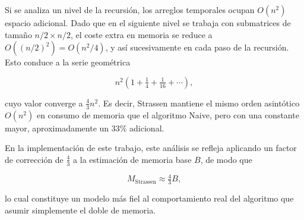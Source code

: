Si se analiza un nivel de la recursión, los arreglos temporales ocupan $O(n^2)$ espacio adicional. 
Dado que en el siguiente nivel se trabaja con submatrices de tamaño $n/2 \times n/2$, el coste extra 
en memoria se reduce a $O((n/2)^2) = O(n^2/4)$, y así sucesivamente en cada paso de la recursión. 
Esto conduce a la serie geométrica

\[
n^2 \left(1 + \tfrac{1}{4} + \tfrac{1}{16} + \cdots \right),
\]

cuyo valor converge a $\tfrac{4}{3} n^2$. Es decir, Strassen mantiene el mismo orden 
asintótico $O(n^2)$ en consumo de memoria que el algoritmo Naive, pero con una constante 
mayor, aproximadamente un $33\%$ adicional. 

En la implementación de este trabajo, este análisis se refleja aplicando un factor de corrección 
de $\tfrac{4}{3}$ a la estimación de memoria base $B$, de modo que

\[
M_{\text{Strassen}} \approx \tfrac{4}{3} B,
\]

lo cual constituye un modelo más fiel al comportamiento real del algoritmo que asumir simplemente 
el doble de memoria.